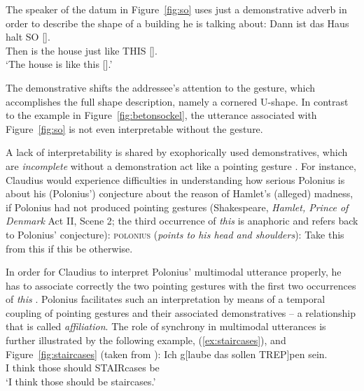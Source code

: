 \documentclass[output=paper
                ,modfonts
                ,nonflat
	        ,collection
	        ,collectionchapter
	        ,collectiontoclongg
 	        ,biblatex
                ,babelshorthands
                ,newtxmath
                ,draftmode
                ,colorlinks, citecolor=brown
]{./langsci/langscibook}
\begin{document}
The speaker of the datum in Figure~\ref{fig:so} uses just a demonstrative adverb in order to describe the shape of a building he is talking about:
%
\ea \label{ex:so}
\gll Dann ist das Haus halt {SO} {[]}. \\
     Then is the house just {like THIS} {[]}. \\
\glt \enquote*{The house is like this [].} 
\z

The demonstrative shifts the addressee's attention to the gesture, which accomplishes the full shape description, namely a cornered U-shape.
%
In contrast to the example in Figure~\ref{fig:betonsockel}, the utterance associated with Figure~\ref{fig:so} is not even interpretable without the gesture.


%
%
A lack of interpretability is shared by exophorically used demonstratives, which are \emph{incomplete}  without a demonstration act like a pointing gesture \citep[]{Kaplan:1989:a}.
%
For instance, Claudius would experience difficulties in understanding how serious Polonius is about his (Polonius') conjecture about the reason of Hamlet's (alleged) madness, if Polonius had not produced pointing gestures (Shakespeare,  \textit{Hamlet, Prince of Denmark} Act II, Scene 2; the third occurrence of \textit{this} is anaphoric and refers back to Polonius' conjecture):
%
\ea \label{ex:this}
\textsc{polonius} (\textit{points to his head and shoulders}): 
Take this from this if this be otherwise.
\z

In order for Claudius to interpret Polonius' multimodal utterance properly, he has to associate correctly the two pointing gestures with the first two occurrences of \textit{this} \citep[cf. the problems discussed by][]{Kupffer:2014}. 
%
Polonius facilitates such an interpretation by means of a temporal coupling of pointing gestures and their associated demonstratives -- a relationship that is called \emph{affiliation}.
%
The role of synchrony in multimodal utterances is further illustrated by the following example, (\ref{ex:staircases}), and Figure~\ref{fig:staircases} (taken from \citealp[]{Luecking:2013:a}):
%
\ea \label{ex:staircases}
\gll Ich g[laube das sollen TREP]pen sein.\\
     I think those should STAIRcases be \\
\glt \enquote*{I think those should be staircases.}
\z
\end{document}

